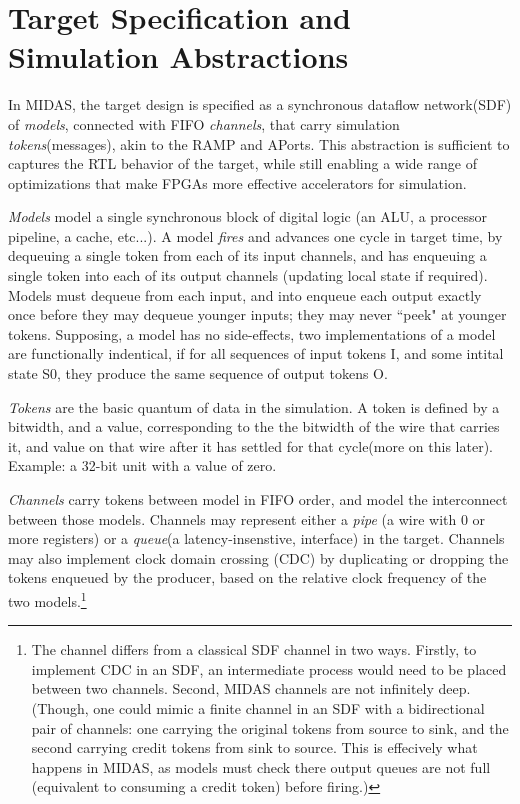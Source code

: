 \section{Target Specification and Simulation Abstractions}

In MIDAS, the target design is specified as a synchronous dataflow network(SDF)
of \emph{models}, connected with FIFO \emph{channels}, that carry simulation
\emph{tokens}(messages), akin to the RAMP\cite{ramp} and APorts\cite{model}.
This abstraction is sufficient to captures the RTL behavior of the target,
while still enabling a wide range of optimizations that make FPGAs more
effective accelerators for simulation.

\emph{Models} model a single synchronous block of digital logic (an ALU, a
processor pipeline, a cache, etc...). A model \emph{fires} and advances one
cycle in target time, by dequeuing a single token from each of its input
channels, and has enqueuing a single token into each of its output channels
(updating local state if required).  Models must dequeue from each input, and
into enqueue each output exactly once before they may dequeue younger inputs;
they may never ``peek" at younger tokens.  Supposing, a model has no
side-effects, two implementations of a model are functionally indentical, if
for all sequences of input tokens I, and some intital state S0, they produce the
same sequence of output tokens O.

\emph{Tokens} are the basic quantum of data in the simulation. A token is
defined by a bitwidth, and a value, corresponding to the the bitwidth of the
wire that carries it, and value on that wire after it has settled for that
cycle(more on this later). Example: a 32-bit unit with a value of zero.

\emph{Channels} carry tokens between model in FIFO order, and model the
interconnect between those models. Channels may represent either a \emph{pipe}
(a wire with 0 or more registers) or a \emph{queue}(a latency-insenstive,
interface) in the target. Channels may also implement clock domain crossing
(CDC) by duplicating or dropping the tokens enqueued by the producer, based on
the relative clock frequency of the two models.\footnote{The channel differs
from a classical SDF channel in two ways. Firstly, to implement CDC in an SDF,
an intermediate process would need to be placed between two channels.  Second,
MIDAS channels are not infinitely deep. (Though, one could mimic a finite
channel in an SDF with a bidirectional pair of channels: one carrying the
original tokens from source to sink, and the second carrying credit tokens from
sink to source. This is effecively what happens in MIDAS, as models must check
there output queues are not full (equivalent to consuming a credit token)
before firing.)}


